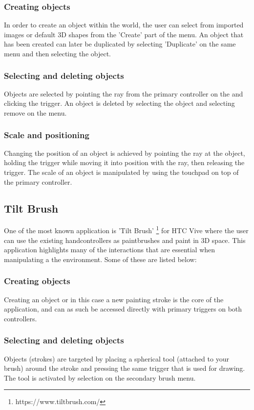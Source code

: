 \subsubsection{Creating objects}
In order to create an object within the world, the user can select from imported images or default 3D shapes from the 'Create' part of the menu. An object that has been created can later be duplicated by selecting 'Duplicate' on the same menu and then selecting the object.
\subsubsection{Selecting and deleting objects}
Objects are selected by pointing the ray from the primary controller on the and clicking the trigger. An object is deleted by selecting the object and selecting remove on the menu.
\subsubsection{Scale and positioning}
Changing the position of an object is achieved by pointing the ray at the object, holding the trigger while moving it into position with the ray, then releasing the trigger. The scale of an object is manipulated by using the touchpad on top of the primary controller.
\subsection{Tilt Brush}
\label{relatedwork:tiltbrush}
 One of the most known application is 'Tilt Brush' \footnote{https://www.tiltbrush.com/} for HTC Vive where the user can use the existing handcontrollers as paintbrushes and paint in 3D space. This application highlights many of the interactions that are essential when manipulating a the environment. Some of these are listed below:
\subsubsection{Creating objects}
Creating an object or in this case a new painting stroke is the core of the application, and can as such be accessed directly with primary triggers on both controllers.
\subsubsection{Selecting and deleting objects}
Objects (strokes) are targeted by placing a spherical tool (attached to your brush) around the stroke and pressing the same trigger that is used for drawing. The tool is activated by selection on the secondary brush menu.
